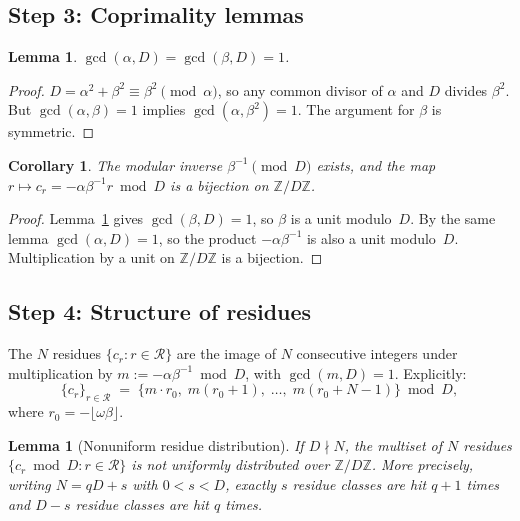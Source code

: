 \documentclass[11pt,reqno]{amsart}
\theoremstyle{plain}
\newtheorem{lemma}[theorem]{Lemma}
\newtheorem{corollary}[theorem]{Corollary}
\theoremstyle{definition}
\theoremstyle{remark}
\begin{document}
\subsection{Step 3: Coprimality lemmas}\label{subsec:step3}

\begin{lemma}\label{lem:gcd}
\(\gcd(\alpha, D) = \gcd(\beta, D) = 1\).
\end{lemma}

\begin{proof}
\(D = \alpha^2 + \beta^2 \equiv \beta^2 \pmod{\alpha}\), so any common
divisor of \(\alpha\) and \(D\) divides \(\beta^2\).  But
\(\gcd(\alpha,\beta)=1\) implies \(\gcd(\alpha,\beta^2)=1\).
The argument for \(\beta\) is symmetric.
\end{proof}

\begin{corollary}\label{cor:inverse}
The modular inverse \(\beta^{-1} \pmod{D}\) exists, and the map
\(r \mapsto c_r = -\alpha\beta^{-1}r \bmod D\) is a bijection on
\(\mathbb{Z}/D\mathbb{Z}\).
\end{corollary}

\begin{proof}
Lemma~\ref{lem:gcd} gives \(\gcd(\beta, D) = 1\), so \(\beta\) is a unit
modulo~\(D\).  By the same lemma \(\gcd(\alpha, D) = 1\), so the product
\(-\alpha\beta^{-1}\) is also a unit modulo~\(D\).  Multiplication by a
unit on \(\mathbb{Z}/D\mathbb{Z}\) is a bijection.
\end{proof}

\subsection{Step 4: Structure of residues}\label{subsec:step4}

The \(N\) residues \(\{c_r : r \in \mathcal{R}\}\) are the image of \(N\)
consecutive integers under multiplication by
\(m := -\alpha\beta^{-1} \bmod D\), with \(\gcd(m, D) = 1\).  Explicitly:
\begin{equation}
    \{c_r\}_{r \in \mathcal{R}} \;=\;
    \{m \cdot r_0,\; m(r_0+1),\; \ldots,\; m(r_0+N-1)\} \bmod D,
\end{equation}
where \(r_0 = -\lfloor\omega\beta\rfloor\).

\begin{lemma}[Nonuniform residue distribution]\label{lem:nonuniform}
If \(D \nmid N\), the multiset of \(N\) residues
\(\{c_r \bmod D : r \in \mathcal{R}\}\) is not uniformly distributed over
\(\mathbb{Z}/D\mathbb{Z}\).  More precisely, writing \(N = qD + s\) with
\(0 < s < D\), exactly \(s\) residue classes are hit \(q+1\) times and
\(D - s\) residue classes are hit \(q\) times.
\end{lemma}
\end{document}
